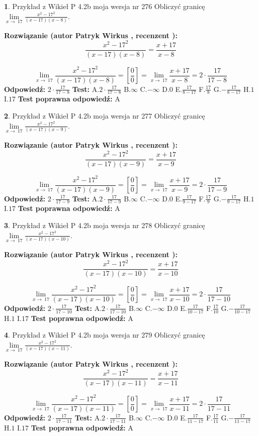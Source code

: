 \documentclass[12pt, a4paper]{article}
\theoremstyle{definition} %
\newtheorem{zad}{}
\newcommand{\zadStart}[1]{\begin{zad}#1\newline}
\newcommand{\zadStop}{\end{zad}}
\newcommand{\rozwStart}[2]{\noindent \textbf{Rozwiązanie (autor #1 , recenzent #2): }\newline}
\newcommand{\rozwStop}{\newline}
\newcommand{\odpStart}{\noindent \textbf{Odpowiedź:}\newline}
\newcommand{\odpStop}{\newline}
\newcommand{\testStart}{\noindent \textbf{Test:}\newline}
\newcommand{\testStop}{\newline}
\newcommand{\kluczStart}{\noindent \textbf{Test poprawna odpowiedź:}\newline}
\newcommand{\kluczStop}{\newline}
\begin{document}
\zadStart{Przykład z Wikieł P 4.2b moja wersja nr 276}
Obliczyć granicę $\lim\limits_{x\to\ 17}\frac{x^{2}-17^{2}}{(x-17)(x-8)}$.
\zadStop
\rozwStart{Patryk Wirkus}{}
$$\frac{x^{2}-17^{2}}{(x-17)(x-8)}=\frac{x+17}{x-8}$$

$$\lim\limits_{x\to\ 17}\frac{x^{2}-17^{2}}{(x-17)(x-8)}=[\frac{0}{0}]=\lim\limits_{x\to\ 17}\frac{x+17}{x-8}=2 \cdot \frac{17}{17-8}$$
\rozwStop
\odpStart
$2 \cdot \frac{17}{17-8}$
\odpStop
\testStart
A.$2 \cdot \frac{17}{17-8}$
B.$\infty$
C.$-\infty$
D.$0$
E.$\frac{17}{8-17}$
F.$\frac{17}{8}$
G.$-\frac{17}{8-17}$
H.$1$
I.$17$
\testStop
\kluczStart
A
\kluczStop



\zadStart{Przykład z Wikieł P 4.2b moja wersja nr 277}
Obliczyć granicę $\lim\limits_{x\to\ 17}\frac{x^{2}-17^{2}}{(x-17)(x-9)}$.
\zadStop
\rozwStart{Patryk Wirkus}{}
$$\frac{x^{2}-17^{2}}{(x-17)(x-9)}=\frac{x+17}{x-9}$$

$$\lim\limits_{x\to\ 17}\frac{x^{2}-17^{2}}{(x-17)(x-9)}=[\frac{0}{0}]=\lim\limits_{x\to\ 17}\frac{x+17}{x-9}=2 \cdot \frac{17}{17-9}$$
\rozwStop
\odpStart
$2 \cdot \frac{17}{17-9}$
\odpStop
\testStart
A.$2 \cdot \frac{17}{17-9}$
B.$\infty$
C.$-\infty$
D.$0$
E.$\frac{17}{9-17}$
F.$\frac{17}{9}$
G.$-\frac{17}{9-17}$
H.$1$
I.$17$
\testStop
\kluczStart
A
\kluczStop



\zadStart{Przykład z Wikieł P 4.2b moja wersja nr 278}
Obliczyć granicę $\lim\limits_{x\to\ 17}\frac{x^{2}-17^{2}}{(x-17)(x-10)}$.
\zadStop
\rozwStart{Patryk Wirkus}{}
$$\frac{x^{2}-17^{2}}{(x-17)(x-10)}=\frac{x+17}{x-10}$$

$$\lim\limits_{x\to\ 17}\frac{x^{2}-17^{2}}{(x-17)(x-10)}=[\frac{0}{0}]=\lim\limits_{x\to\ 17}\frac{x+17}{x-10}=2 \cdot \frac{17}{17-10}$$
\rozwStop
\odpStart
$2 \cdot \frac{17}{17-10}$
\odpStop
\testStart
A.$2 \cdot \frac{17}{17-10}$
B.$\infty$
C.$-\infty$
D.$0$
E.$\frac{17}{10-17}$
F.$\frac{17}{10}$
G.$-\frac{17}{10-17}$
H.$1$
I.$17$
\testStop
\kluczStart
A
\kluczStop



\zadStart{Przykład z Wikieł P 4.2b moja wersja nr 279}
Obliczyć granicę $\lim\limits_{x\to\ 17}\frac{x^{2}-17^{2}}{(x-17)(x-11)}$.
\zadStop
\rozwStart{Patryk Wirkus}{}
$$\frac{x^{2}-17^{2}}{(x-17)(x-11)}=\frac{x+17}{x-11}$$

$$\lim\limits_{x\to\ 17}\frac{x^{2}-17^{2}}{(x-17)(x-11)}=[\frac{0}{0}]=\lim\limits_{x\to\ 17}\frac{x+17}{x-11}=2 \cdot \frac{17}{17-11}$$
\rozwStop
\odpStart
$2 \cdot \frac{17}{17-11}$
\odpStop
\testStart
A.$2 \cdot \frac{17}{17-11}$
B.$\infty$
C.$-\infty$
D.$0$
E.$\frac{17}{11-17}$
F.$\frac{17}{11}$
G.$-\frac{17}{11-17}$
H.$1$
I.$17$
\testStop
\kluczStart
A
\kluczStop
\end{document}
